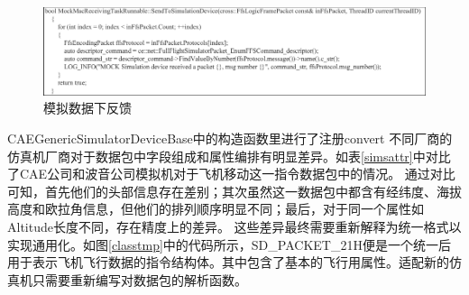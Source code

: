 \begin{figure}[h!]
    \begin{center}
        \includegraphics[width=\textwidth]{pictures/code10.pdf}
        \caption{模拟数据下反馈}
        \label{feedbackmock}
    \end{center}
\end{figure}
\par
CAEGenericSimulatorDeviceBase中的构造函数里进行了注册convert
不同厂商的仿真机厂商对于数据包中字段组成和属性编排有明显差异。如表\ref{simsattr}中对比了CAE公司和波音公司模拟机对于飞机移动这一指令数据包中的情况。
通过对比可知，首先他们的头部信息存在差别；其次虽然这一数据包中都含有经纬度、海拔高度和欧拉角信息，但他们的排列顺序明显不同；最后，对于同一个属性如Altitude长度不同，存在精度上的差异。
这些差异最终需要重新解释为统一格式以实现通用化。如图\ref{classtmp}中的代码所示，SD\_PACKET\_21H便是一个统一后用于表示飞机飞行数据的指令结构体。其中包含了基本的飞行用属性。适配新的仿真机只需要重新编写对数据包的解析函数。
